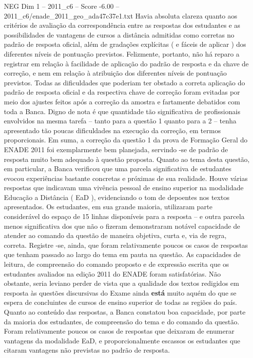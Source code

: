 \begin{textsample}{NEG Dim 1 – 2011\_c6 – Score -6.00 – 2011\_c6/enade\_2011\_geo\_ada47c37e1.txt}
Havia absoluta clareza quanto aos critérios de avaliação da correspondência entre as respostas dos estudantes e as possibilidades de vantagens de cursos a distância admitidas como corretas no padrão de resposta oficial, além de gradações explícitas ( e fáceis de aplicar ) dos diferentes níveis de pontuação previstos.
Felizmente, portanto, não há reparo a registrar em relação à facilidade de aplicação do padrão de resposta e da chave de correção, e nem em relação à atribuição dos diferentes níveis de pontuação previstos.
Todas as dificuldades que poderiam ter obstado a correta aplicação do padrão de resposta oficial e da respectiva chave de correção foram evitadas por meio dos ajustes feitos após a correção da amostra e fartamente debatidos com toda a Banca.
Digno de nota é que quantidade tão significativa de profissionais envolvidos na mesma tarefa – tanto para a questão 1 quanto para a 2 – tenha apresentado tão poucas dificuldades na execução da correção, em termos proporcionais.
Em suma, a correção da questão 1 da prova de Formação Geral do ENADE 2011 foi exemplarmente bem planejada, servindo -se de padrão de resposta muito bem adequado à questão proposta.
Quanto ao tema desta questão, em particular, a Banca verificou que uma parcela significativa de estudantes evocou experiências bastante concretas e próximas de sua realidade.
Houve várias respostas que indicavam uma vivência pessoal de ensino superior na modalidade Educação a Distância ( EaD ), evidenciando o tom de depoentes nos textos apresentados.
Os estudantes, em sua grande maioria, utilizaram parte considerável do espaço de 15 linhas disponíveis para a resposta – e outra parcela menos significativa dos que não o fizeram demonstraram notável capacidade de atender ao comando da questão de maneira objetiva, curta e, via de regra, correta.
Registre -se, ainda, que foram relativamente poucos os casos de respostas que tenham passado ao largo do tema em pauta na questão.
As capacidades de leitura, de compreensão do comando proposto e de expressão escrita que os estudantes avaliados na edição 2011 do ENADE foram satisfatórias.
Não obstante, seria leviano perder de vista que a qualidade dos textos redigidos em resposta às questões discursivas do Exame ainda \textbf{está} muito aquém do que se espera de concluintes de cursos de ensino superior de todas as regiões do país.
Quanto ao conteúdo das respostas, a Banca constatou boa capacidade, por parte da maioria dos estudantes, de compreensão do tema e do comando da questão.
Foram relativamente poucos os casos de respostas que deixaram de enumerar vantagens da modalidade EaD, e proporcionalmente escassos os estudantes que citaram vantagens não previstas no padrão de resposta.

\end{textsample}
